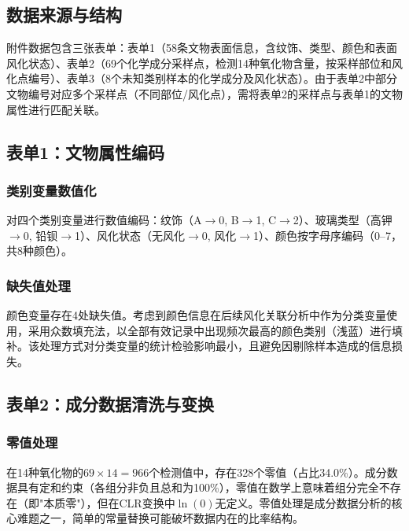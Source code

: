 \documentclass[12pt,a4paper]{ctexart}
\begin{document}
\subsection{数据来源与结构}

附件数据包含三张表单：表单1（58条文物表面信息，含纹饰、类型、颜色和表面风化状态）、表单2（69个化学成分采样点，检测14种氧化物含量，按采样部位和风化点编号）、表单3（8个未知类别样本的化学成分及风化状态）。由于表单2中部分文物编号对应多个采样点（不同部位/风化点），需将表单2的采样点与表单1的文物属性进行匹配关联。

\subsection{表单1：文物属性编码}

\subsubsection{类别变量数值化}

对四个类别变量进行数值编码：纹饰（A$\rightarrow$0, B$\rightarrow$1, C$\rightarrow$2）、玻璃类型（高钾$\rightarrow$0, 铅钡$\rightarrow$1）、风化状态（无风化$\rightarrow$0, 风化$\rightarrow$1）、颜色按字母序编码（0--7，共8种颜色）。

\subsubsection{缺失值处理}

颜色变量存在4处缺失值。考虑到颜色信息在后续风化关联分析中作为分类变量使用，采用众数填充法，以全部有效记录中出现频次最高的颜色类别（浅蓝）进行填补。该处理方式对分类变量的统计检验影响最小，且避免因剔除样本造成的信息损失。

\subsection{表单2：成分数据清洗与变换}

\subsubsection{零值处理}

在14种氧化物的$69\times14=966$个检测值中，存在328个零值（占比34.0\%）。成分数据具有定和约束（各组分非负且总和为100\%），零值在数学上意味着组分完全不存在（即"本质零"），但在CLR变换中$\ln(0)$无定义。零值处理是成分数据分析的核心难题之一，简单的常量替换可能破坏数据内在的比率结构\cite{10}。
\end{document}
